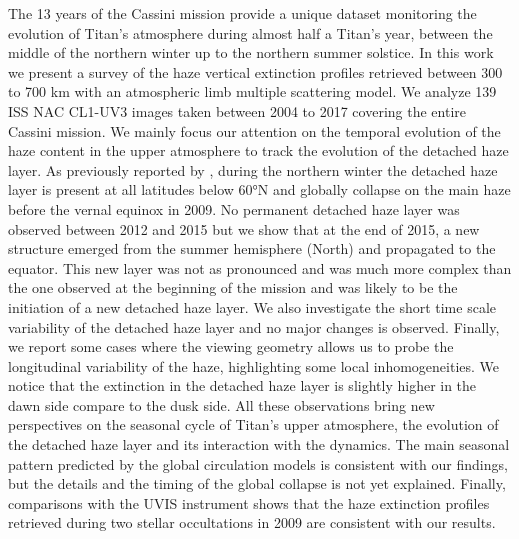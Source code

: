 The 13 years of the Cassini mission provide a unique dataset monitoring
the evolution of Titan’s atmosphere during almost half a Titan's year,
between the middle of the northern winter up to the northern summer solstice.
In this work we present a survey of the haze vertical extinction profiles retrieved
between 300 to 700 km with an atmospheric limb multiple scattering model.
We analyze 139 ISS NAC CL1-UV3 images taken between 2004 to 2017 covering the
entire Cassini mission.
We mainly focus our attention on the temporal evolution of the haze content
in the upper atmosphere to track the evolution of the detached haze layer.
As previously reported by \cite{West2011}, during the northern winter the detached haze layer is present
at all latitudes below \ang{60}N and globally collapse on the main haze
before the vernal equinox in 2009.
No permanent detached haze layer was observed between 2012 and 2015 but
we show that at the end of 2015, a new structure emerged from
the summer hemisphere (North) and propagated to the equator. This new layer
was not as pronounced and was much more complex than the one observed at the
beginning of the mission and was likely to be the initiation of a new detached haze layer.
We also investigate the short time scale variability of the detached haze
layer and no major changes is observed. Finally, we report some cases
where the viewing geometry allows us to probe the longitudinal variability
of the haze, highlighting some local inhomogeneities.
We notice that the extinction in the detached haze layer is slightly higher in the dawn
side compare to the dusk side.
All these observations bring new perspectives
on the seasonal cycle of Titan's upper atmosphere, the evolution of the detached
haze layer and its interaction with the dynamics.
The main seasonal pattern predicted by the global circulation models is consistent
with our findings, but the details and the timing of the global collapse
is not yet explained. Finally, comparisons with the UVIS instrument shows
that the haze extinction profiles retrieved during two stellar occultations
in 2009 are consistent with our results.